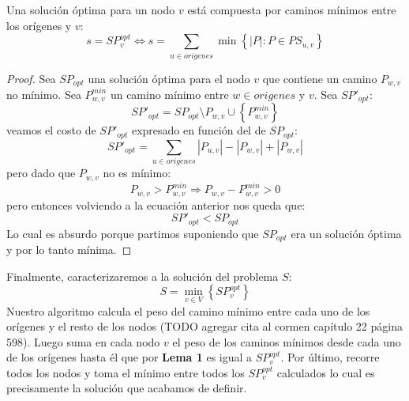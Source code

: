 \begin{lema}
\label{lema_p2}
Una solución óptima para un nodo $v$ está compuesta por caminos mínimos entre los orígenes
y $v$:
\begin{displaymath}
  s = SP_v^{opt} \Leftrightarrow s = \sum_{u \in origenes} \min \left\{ { \left\vert{P}\right\vert : P \in PS_{u, v}} \right\}
\end{displaymath}
\end{lema}
\begin{proof}
  Sea $SP_{opt}$ una solución óptima para el nodo $v$ que contiene un camino $P_{w,v}$ no mínimo. Sea $P_{w,v}^{min}$ 
un camino mínimo entre $w \in origenes$ y $v$. Sea $SP'_{opt}$:
\begin{displaymath}
SP'_{opt} = SP_{opt} \setminus P_{w, v} \cup \left\{{P_{w,v}^{min}}\right\}
\end{displaymath}
veamos el costo de $SP'_{opt}$ expresado en función del de $SP_{opt}$:
\begin{displaymath}
  SP'_{opt} = \sum_{u \in origenes} \left\vert{P_{u,v}}\right\vert - \left\vert{P_{w,v}}\right\vert + \left\vert{P_{w,v}}\right\vert
\end{displaymath}
pero dado que $P_{w,v}$ no es mínimo:
\begin{displaymath}
  P_{w,v} > P_{w,v}^{min} \Rightarrow P_{w,v} - P_{w,v}^{min} > 0
\end{displaymath}
pero entonces volviendo a la ecuación anterior nos queda que:
\begin{displaymath}
  SP'_{opt} < SP_{opt}
\end{displaymath}
Lo cual es absurdo porque partimos suponiendo que $SP_{opt}$ era un solución óptima y por lo tanto mínima.
\end{proof}

Finalmente, caracterizaremos a la solución del problema $S$:
\begin{displaymath}
  S = \min_{v \in V} \left\{ {SP_{v}^{opt}} \right\}
\end{displaymath}
Nuestro algoritmo calcula el peso del camino mínimo entre cada uno de los orígenes y el resto de los nodos (TODO agregar cita
al cormen capítulo 22 página 598). 
Luego suma en cada nodo $v$ el peso de los caminos mínimos desde cada uno de los orígenes hasta él que por \textbf{Lema 1} es
igual a $SP_{v}^{opt}$. Por último, recorre todos los nodos y toma el mínimo entre todos los $SP_{v}^{opt}$ calculados
lo cual es precisamente la solución que acabamos de definir.

